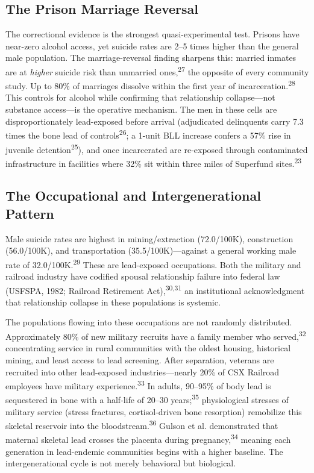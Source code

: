 \documentclass[11pt,twocolumn]{article}
\begin{document}
\subsection{The Prison Marriage Reversal}

The correctional evidence is the strongest quasi-experimental test. Prisons have near-zero alcohol access, yet suicide rates are 2--5 times higher than the general male population. The marriage-reversal finding sharpens this: married inmates are at \textit{higher} suicide risk than unmarried ones,\textsuperscript{27} the opposite of every community study. Up to 80\% of marriages dissolve within the first year of incarceration.\textsuperscript{28} This controls for alcohol while confirming that relationship collapse---not substance access---is the operative mechanism. The men in these cells are disproportionately lead-exposed before arrival (adjudicated delinquents carry 7.3 times the bone lead of controls\textsuperscript{26}; a 1-unit BLL increase confers a 57\% rise in juvenile detention\textsuperscript{25}), and once incarcerated are re-exposed through contaminated infrastructure in facilities where 32\% sit within three miles of Superfund sites.\textsuperscript{23}

\subsection{The Occupational and Intergenerational Pattern}

Male suicide rates are highest in mining/extraction (72.0/100K), construction (56.0/100K), and transportation (35.5/100K)---against a general working male rate of 32.0/100K.\textsuperscript{29} These are lead-exposed occupations. Both the military and railroad industry have codified spousal relationship failure into federal law (USFSPA, 1982; Railroad Retirement Act),\textsuperscript{30,31} an institutional acknowledgment that relationship collapse in these populations is systemic.

The populations flowing into these occupations are not randomly distributed. Approximately 80\% of new military recruits have a family member who served,\textsuperscript{32} concentrating service in rural communities with the oldest housing, historical mining, and least access to lead screening. After separation, veterans are recruited into other lead-exposed industries---nearly 20\% of CSX Railroad employees have military experience.\textsuperscript{33} In adults, 90--95\% of body lead is sequestered in bone with a half-life of 20--30 years;\textsuperscript{35} physiological stresses of military service (stress fractures, cortisol-driven bone resorption) remobilize this skeletal reservoir into the bloodstream.\textsuperscript{36} Gulson et al. demonstrated that maternal skeletal lead crosses the placenta during pregnancy,\textsuperscript{34} meaning each generation in lead-endemic communities begins with a higher baseline. The intergenerational cycle is not merely behavioral but biological.
\end{document}
